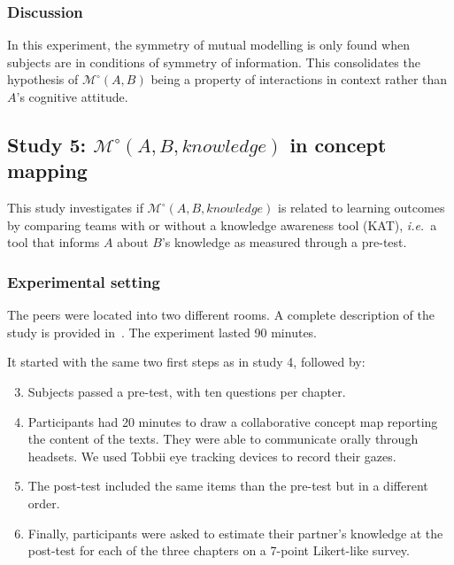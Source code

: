 \documentclass[natbib]{svjour3}
\newcommand{\ie}{{\textit{i.e.\ }}}
\newcommand{\Model}[3]{{$\mathcal{M}^{\circ}(#1, #2, #3)$}}
\newcommand{\gModel}[2]{{$\mathcal{M}^{\circ}(#1, #2)$}}
\begin{document}
\subsubsection*{Discussion}

In this experiment, the symmetry of mutual modelling is only found when subjects
are in conditions of symmetry of information. This consolidates the hypothesis
of \gModel{A}{B} being a property of interactions in context rather than $A$'s
cognitive attitude.



\subsection{Study 5: \Model{A}{B}{knowledge} in concept mapping}

This study investigates if \Model{A}{B}{knowledge} is related to learning
outcomes by comparing teams with or without a knowledge awareness tool (KAT),
\ie a tool that informs $A$ about $B$'s knowledge as measured through a pre-test.

\subsubsection*{Experimental setting}

The peers were located into two different rooms. A complete description of the
study is provided in~\citet{sangin2008learners}. The experiment lasted 90 minutes.

It started with the same two first steps as in study 4, followed by:

\begin{enumerate}
    \setcounter{enumi}{2}

    \item Subjects passed a pre-test, with ten questions per chapter. 

    \item Participants had 20 minutes to draw a collaborative concept map
        reporting the content of the texts. They were able to communicate
        orally through headsets.  We used Tobbii eye tracking devices to
        record their gazes.

    \item The post-test included the same items than the pre-test but in a
        different order. 

    \item  Finally, participants were asked to estimate their partner's
        knowledge at the post-test for each of the three chapters on a 7-point
        Likert-like survey. 

\end{enumerate}
\end{document}
